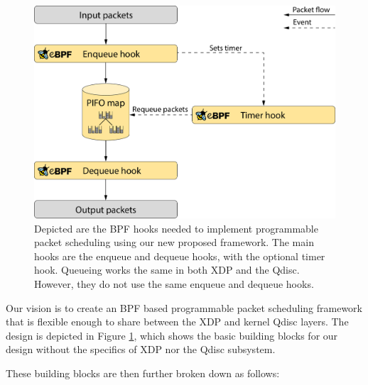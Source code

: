 \documentclass[sigconf, nonacm]{acmart}
\begin{document}
\begin{figure}

  \includegraphics[width=\linewidth]{bpf_pps_flow.pdf}

  \caption{Depicted are the BPF hooks needed to implement programmable packet scheduling using our new proposed framework. The main hooks are the enqueue and dequeue hooks, with the optional timer hook. Queueing works the same in both XDP and the Qdisc. However, they do not use the same enqueue and dequeue hooks.\label{fig:bpf_pps_flow}}

\end{figure}

Our vision is to create an BPF based programmable packet scheduling framework that is flexible enough to share between the XDP and kernel Qdisc layers. The design is depicted in Figure \ref{fig:bpf_pps_flow}, which shows the basic building blocks for our design without the specifics of XDP nor the Qdisc subsystem.

These building blocks are then further broken down as follows:
\end{document}

